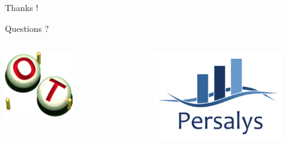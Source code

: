 \documentclass{beamer}
\begin{document}









\begin{frame}

\begin{center}
Thanks !
\end{center}

\begin{center}
Questions ?
\end{center}

\begin{columns}
\centering
\includegraphics[width=0.5\textwidth]{figures/logo-openturns.png}

\includegraphics[width=0.8\textwidth]{figures/PERSALYS-LOGO.png}

\end{columns}

\end{frame}
  
\end{document}
